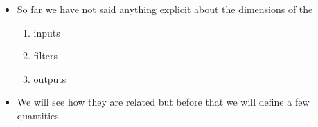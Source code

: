 \begin{frame}
\end{frame}


\begin{frame}
	\begin{columns}
		
		\column{\textwidth}
		\begin{overlayarea}{\textwidth}{\textheight}
			\justifying
			\begin{itemize}
				\item So far we have not said anything explicit about the dimensions of the 
				      \begin{enumerate}
				      	\item<2-> inputs
				      	\item<3-> filters
				      	\item<4-> outputs
				      \end{enumerate}
				      \item<6-> We will see how they are related but before that we will define a few quantities
			\end{itemize}
			
		\end{overlayarea}
	\end{columns}
\end{frame}


